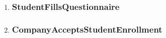 \begin{enumerate}[label=\textbf{UC\arabic* -}]
\item \subsubsection{StudentFillsQuestionnaire}

\begin{figure}[H]
    \centering
\end{figure}

\item \subsubsection{CompanyAcceptsStudentEnrollment}


\end{enumerate}
